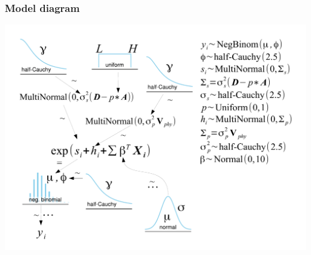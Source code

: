 \documentclass{beamer}
\begin{document}
\begin{frame}
  \frametitle{Model diagram}
  \begin{center}
    \includegraphics[height = 0.8\textheight, width = \textwidth,  keepaspectratio = true]{figure/mammal_deg_over_model}
  \end{center}
\end{frame}

\end{document}
